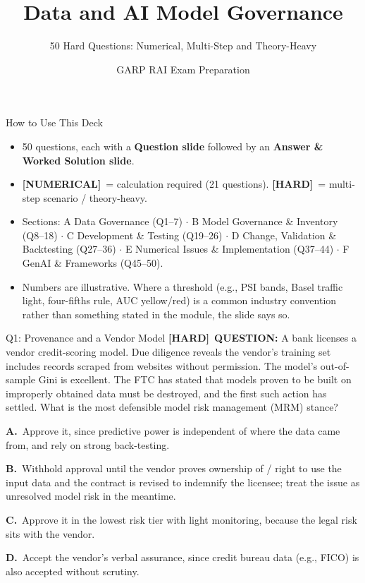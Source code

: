 \documentclass[8pt]{beamer}
\title{Data and AI Model Governance}
\subtitle{50 Hard Questions: Numerical, Multi-Step and Theory-Heavy}
\author{GARP RAI Exam Preparation}
\date{}
\newcommand{\fs}{\fontsize{10}{12}\selectfont}
\newcommand{\opts}[4]{\par\vspace{0.12cm}\noindent\textbf{A.}~#1\par\vspace{0.08cm}\noindent\textbf{B.}~#2\par\vspace{0.08cm}\noindent\textbf{C.}~#3\par\vspace{0.08cm}\noindent\textbf{D.}~#4\par}
\newcommand{\numtag}{\textcolor{mypurple}{\textbf{[NUMERICAL]}}}
\newcommand{\hard}{\textcolor{myorange}{\textbf{[HARD]}}}
\begin{document}
\begin{frame}
\titlepage
\end{frame}

\begin{frame}{How to Use This Deck}
\fs
\begin{itemize}
\item 50 questions, each with a \textbf{Question slide} followed by an \textbf{Answer \& Worked Solution slide}.
\item \numtag\ = calculation required (21 questions). \hard\ = multi-step scenario / theory-heavy.
\item Sections: A Data Governance (Q1--7) $\cdot$ B Model Governance \& Inventory (Q8--18) $\cdot$ C Development \& Testing (Q19--26) $\cdot$ D Change, Validation \& Backtesting (Q27--36) $\cdot$ E Numerical Issues \& Implementation (Q37--44) $\cdot$ F GenAI \& Frameworks (Q45--50).
\item Numbers are illustrative. Where a threshold (e.g., PSI bands, Basel traffic light, four-fifths rule, AUC yellow/red) is a common industry convention rather than something stated in the module, the slide says so.
\end{itemize}
\end{frame}


\begin{frame}[t]{Q1: Provenance and a Vendor Model}
\fs
\hard\ \textbf{QUESTION:} A bank licenses a vendor credit-scoring model. Due diligence reveals the vendor's training set includes records scraped from websites without permission. The model's out-of-sample Gini is excellent. The FTC has stated that models proven to be built on improperly obtained data must be destroyed, and the first such action has settled. What is the most defensible model risk management (MRM) stance?
\opts{Approve it, since predictive power is independent of where the data came from, and rely on strong back-testing.}
{Withhold approval until the vendor proves ownership of / right to use the input data and the contract is revised to indemnify the licensee; treat the issue as unresolved model risk in the meantime.}
{Approve it in the lowest risk tier with light monitoring, because the legal risk sits with the vendor.}
{Accept the vendor's verbal assurance, since credit bureau data (e.g., FICO) is also accepted without scrutiny.}
\end{frame}
\end{document}
